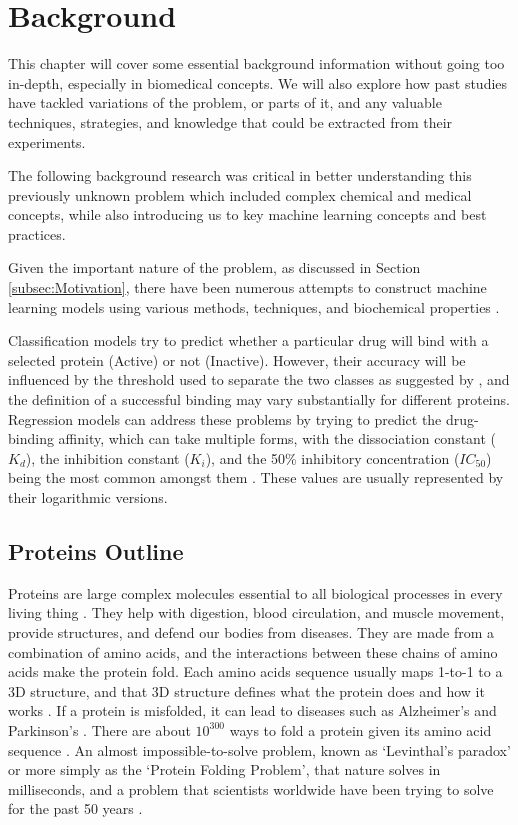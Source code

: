 \section{Background}
\label{sec:Background}

This chapter will cover some essential background information without going too in-depth, especially in biomedical concepts. We will also explore how past studies have tackled variations of the problem, or parts of it, and any valuable techniques, strategies, and knowledge that could be extracted from their experiments.

The following background research was critical in better understanding this previously unknown problem which included complex chemical and medical concepts, while also introducing us to key machine learning concepts and best practices.

Given the important nature of the problem, as discussed in Section \ref{subsec:Motivation}, there have been numerous attempts to construct machine learning models using various methods, techniques, and biochemical properties \citep{Shar2016, Wang2020, Jiang2020}.

Classification models try to predict whether a particular drug will bind with a selected protein (Active) or not (Inactive). However, their accuracy will be influenced by the threshold used to separate the two classes as suggested by \cite{Shar2016}, and the definition of a successful binding may vary substantially for different proteins. Regression models can address these problems by trying to predict the drug-binding affinity, which can take multiple forms, with the dissociation constant ($K_d$), the inhibition constant ($K_i$), and the 50\% inhibitory concentration ($IC_{50}$) being the most common amongst them \citep{Jiang2020}. These values are usually represented by their logarithmic versions.

\subsection{Proteins Outline}

Proteins are large complex molecules essential to all biological processes in every living thing \citep{AlphaFold_Blog, CellBiologyEssentials}. They help with digestion, blood circulation, and muscle movement, provide structures, and defend our bodies from diseases. They are made from a combination of amino acids, and the interactions between these chains of amino acids make the protein fold. Each amino acids sequence usually maps 1-to-1 to a 3D structure, and that 3D structure defines what the protein does and how it works \citep{LexFridmanVideo}. If a protein is misfolded, it can lead to diseases such as Alzheimer's and Parkinson's \citep{Misfolding_Diseases}. There are about $10^{300}$ ways to fold a protein given its amino acid sequence \citep{Levinthal1969}. An almost impossible-to-solve problem, known as `Levinthal's paradox' or more simply as the `Protein Folding Problem', that nature solves in milliseconds, and a problem that scientists worldwide have been trying to solve for the past 50 years \citep{AlphaFold_Blog, Torrisi2020}. 

